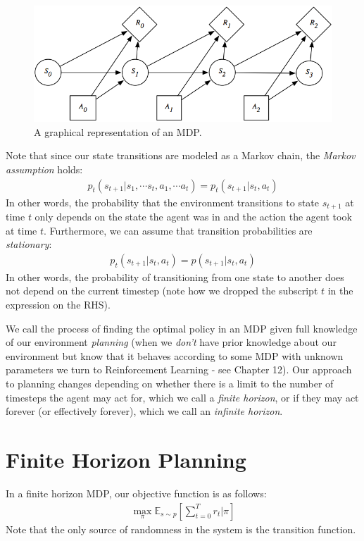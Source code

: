 \begin{figure}[H]
    \centering
    \includegraphics[width=0.5\paperwidth]{../MarkovDecisionProcesses/fig/MDP.png}
    \caption{A graphical representation of an MDP.}
\end{figure}

Note that since our state transitions are modeled as a Markov chain, the \textit{Markov assumption} holds:
\begin{align*}
    p_t(s_{t + 1}|s_1, \cdots s_t, a_1, \cdots a_t) = p_t(s_{t + 1}|s_t, a_t)
\end{align*}
In other words, the probability that the environment transitions to state $s_{t + 1}$ at time $t$ only depends on the state the agent was in and the action the agent took at time $t$. Furthermore, we can assume that transition probabilities are \textit{stationary}:
\begin{align*}
p_{t}(s_{t + 1}|s_t, a_t) = p(s_{t + 1}|s_t, a_t)
\end{align*}
In other words, the probability of transitioning from one state to another does not depend on the current timestep (note how we dropped the subscript $t$ in the expression on the RHS).

We call the process of finding the optimal policy in an MDP given full knowledge of our environment \textit{planning} (when we \textit{don't} have prior knowledge about our environment but know that it behaves according to some MDP with unknown parameters we turn to Reinforcement Learning - see Chapter 12). Our approach to planning changes depending on whether there is a limit to the number of timesteps the agent may act for, which we call a \textit{finite horizon}, or if they may act forever (or effectively forever), which we call an \textit{infinite horizon}.

\section{Finite Horizon Planning}
In a finite horizon MDP, our objective function is as follows:
\begin{align*}
\max_{\pi} \mathbb{E}_{s\sim p}\left[\sum_{t=0}^Tr_t|\pi\right]
\end{align*}
Note that the only source of randomness in the system is the transition function.\\

